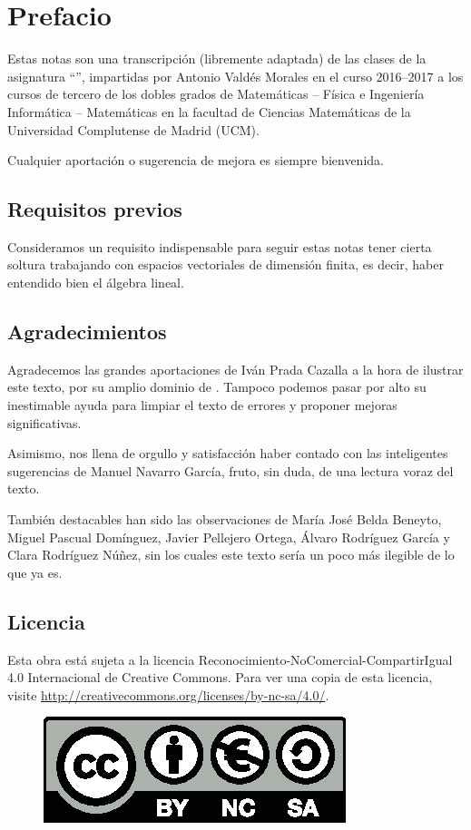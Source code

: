 \section*{Prefacio}
Estas notas son una transcripción (libremente adaptada) de las clases de la asignatura ``'', impartidas por Antonio Valdés Morales en el curso 2016--2017 a los cursos de tercero de los dobles grados de  Matemáticas -- Física e Ingeniería Informática -- Matemáticas en la facultad de Ciencias Matemáticas de la Universidad Complutense de Madrid (UCM).

Cualquier aportación o sugerencia de mejora es siempre bienvenida.
\subsection*{Requisitos previos}
Consideramos un requisito indispensable para seguir estas notas tener cierta soltura trabajando con espacios vectoriales de dimensión finita, es decir, haber entendido bien el álgebra lineal.

\subsection*{Agradecimientos}
Agradecemos las grandes aportaciones de Iván Prada Cazalla a la hora de ilustrar este texto, por su amplio dominio de . Tampoco podemos pasar por alto su inestimable ayuda para limpiar el texto de errores y proponer mejoras significativas.

Asimismo, nos llena de orgullo y satisfacción haber contado con las inteligentes sugerencias de Manuel Navarro García, fruto, sin duda, de una lectura voraz del texto.

También destacables han sido las observaciones de María José Belda Beneyto, Miguel Pascual Domínguez, Javier Pellejero Ortega, Álvaro Rodríguez García y Clara Rodríguez Núñez, sin los cuales este texto sería un poco más ilegible de lo que ya es.
\subsection*{Licencia}
Esta obra está sujeta a la licencia Reconocimiento-NoComercial-CompartirIgual 4.0 Internacional de Creative Commons. Para ver una copia de esta licencia, visite \url{http://creativecommons.org/licenses/by-nc-sa/4.0/}.
\begin{figure}[h]
	\centering
	\includegraphics[scale=1]{Graficos/licencia.eps}
	\end{figure}